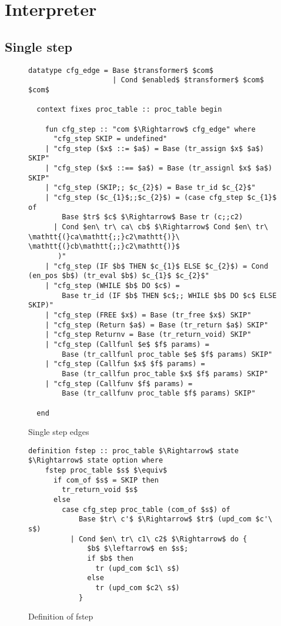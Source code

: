 \section{Interpreter}\label{section:interpreter}

\subsection{Single step}\label{subsection:single_step}

\begin{figure}
  \begin{lstlisting}[frame=single, mathescape=true]
  datatype cfg_edge = Base $transformer$ $com$
                    | Cond $enabled$ $transformer$ $com$ $com$

  context fixes proc_table :: proc_table begin

    fun cfg_step :: "com $\Rightarrow$ cfg_edge" where
      "cfg_step SKIP = undefined"
    | "cfg_step ($x$ ::= $a$) = Base (tr_assign $x$ $a$) SKIP"
    | "cfg_step ($x$ ::== $a$) = Base (tr_assignl $x$ $a$) SKIP"
    | "cfg_step (SKIP;; $c_{2}$) = Base tr_id $c_{2}$"
    | "cfg_step ($c_{1}$;;$c_{2}$) = (case cfg_step $c_{1}$ of
        Base $tr$ $c$ $\Rightarrow$ Base tr (c;;c2)
      | Cond $en\ tr\ ca\ cb$ $\Rightarrow$ Cond $en\ tr\ \mathtt{(}ca\mathtt{;;}c2\mathtt{)}\ \mathtt{(}cb\mathtt{;;}c2\mathtt{)}$
       )"
    | "cfg_step (IF $b$ THEN $c_{1}$ ELSE $c_{2}$) = Cond (en_pos $b$) (tr_eval $b$) $c_{1}$ $c_{2}$"
    | "cfg_step (WHILE $b$ DO $c$) =
        Base tr_id (IF $b$ THEN $c$;; WHILE $b$ DO $c$ ELSE SKIP)"
    | "cfg_step (FREE $x$) = Base (tr_free $x$) SKIP"
    | "cfg_step (Return $a$) = Base (tr_return $a$) SKIP"
    | "cfg_step Returnv = Base (tr_return_void) SKIP"
    | "cfg_step (Callfunl $e$ $f$ params) =
        Base (tr_callfunl proc_table $e$ $f$ params) SKIP"
    | "cfg_step (Callfun $x$ $f$ params) =
        Base (tr_callfun proc_table $x$ $f$ params) SKIP"
    | "cfg_step (Callfunv $f$ params) =
        Base (tr_callfunv proc_table $f$ params) SKIP"

  end
  \end{lstlisting}

  \caption{Single step edges}
  \label{fig:single_step_edges}
\end{figure}

\begin{figure}
  \begin{lstlisting}[frame=single, mathescape=true]
  definition fstep :: proc_table $\Rightarrow$ state $\Rightarrow$ state option where
    fstep proc_table $s$ $\equiv$
      if com_of $s$ = SKIP then
        tr_return_void $s$
      else
        case cfg_step proc_table (com_of $s$) of
            Base $tr\ c'$ $\Rightarrow$ $tr$ (upd_com $c'\ s$)
          | Cond $en\ tr\ c1\ c2$ $\Rightarrow$ do {
              $b$ $\leftarrow$ en $s$;
              if $b$ then
                tr (upd_com $c1\ s$)
              else  
                tr (upd_com $c2\ s$)
            }
  \end{lstlisting}

  \caption{Definition of fstep}
  \label{fig:fstep_def}
\end{figure}


